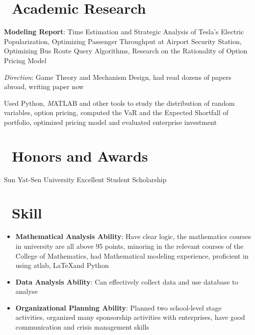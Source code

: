 \documentclass{resume}
\begin{document}
\section{\faFlask\ Academic Research}
\textbf{Modeling Report}: Time Estimation and Strategic Analysis of Tesla’s Electric Popularization, Optimizing Passenger Throughput at Airport Security Station, Optimizing Bus Route Query Algorithms, Research on the Rationality of Option Pricing Model


\textit{Direction}: Game Theory and Mechanism Design, had read dozens of papers abroad, writing paper now


Used Python, \textit{M}ATLAB and other tools to study the distribution of random variables, option pricing, computed the VaR and the Expected Shortfall of portfolio, optimized pricing model and evaluated enterprise investment

\section{\faHeartO\ Honors and Awards}
Sun Yat-Sen University Excellent Student Scholarship


\section{\faInfo\ Skill}
\begin{itemize}[parsep=0.5ex]
  \item \textbf{Mathematical Analysis Ability}: Have clear logic, the mathematics courses in university are all above 95 points, minoring in the relevant courses of the College of Mathematics, had Mathematical modeling experience, proficient in using atlab, \LaTeX and Python
  \item \textbf{Data Analysis Ability}: Can effectively collect data and use database to analyse
  \item  \textbf{Organizational Planning Ability}: Planned two school-level stage activities, organized many sponsorship activities with enterprises, have good communication and crisis management skills
\end{itemize}

%
%
\end{document}
